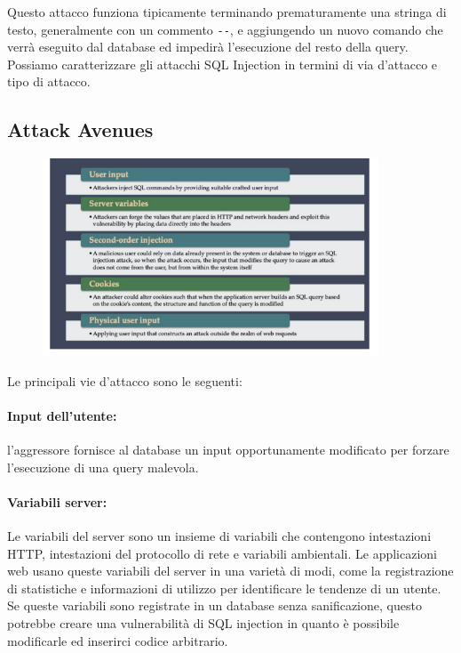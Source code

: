 Questo attacco funziona tipicamente terminando prematuramente una stringa di
testo, generalmente con un commento \verb|--|, e aggiungendo un nuovo comando
che verrà eseguito dal database ed impedirà l'esecuzione del resto della query.\\

Possiamo caratterizzare gli attacchi SQL Injection in termini di via d'attacco e
tipo di attacco.

\subsection{Attack Avenues}

\begin{figure}[H]
      \centering
      \includegraphics[width=10cm, keepaspectratio]{capitoli/sql_security/imgs/sql3.png}
\end{figure}

Le principali vie d'attacco sono le seguenti:

\paragraph{Input dell'utente:}
l'aggressore fornisce al database un input opportunamente modificato per
forzare l'esecuzione di una query malevola.

\paragraph{Variabili server:}
Le variabili del server sono un insieme di variabili che contengono intestazioni
HTTP, intestazioni del protocollo di rete e variabili ambientali. Le
applicazioni web usano queste variabili del server in una varietà di modi, come
la registrazione di statistiche e informazioni di utilizzo per identificare le
tendenze di un utente. Se queste variabili sono registrate in un database senza
sanificazione, questo potrebbe creare una vulnerabilità di SQL injection in
quanto è possibile modificarle ed inserirci codice arbitrario.


